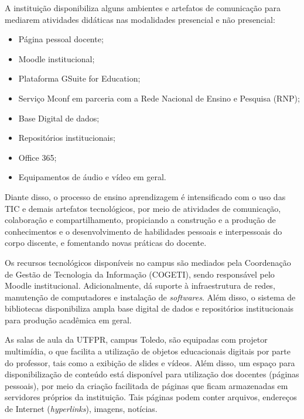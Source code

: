 

A instituição disponibiliza alguns ambientes e artefatos de comunicação para mediarem atividades didáticas nas modalidades presencial e não presencial:

\begin{itemize}
    \item Página pessoal docente;
    \item Moodle institucional;
    \item Plataforma GSuite for Education;
    \item Serviço Mconf em parceria com a Rede Nacional de Ensino e Pesquisa (RNP);
    \item Base Digital de dados;
    \item Repositórios institucionais;
    \item Office 365;
    \item Equipamentos de áudio e vídeo em geral.
\end{itemize}
    
Diante disso, o processo de ensino aprendizagem é intensificado com o uso das TIC e demais artefatos tecnológicos, por meio de atividades de comunicação, colaboração e compartilhamento, propiciando a construção e a produção de conhecimentos e o desenvolvimento de habilidades pessoais e interpessoais do corpo discente, e fomentando novas práticas do docente.

Os recursos tecnológicos disponíveis no campus são mediados pela Coordenação de Gestão de Tecnologia da Informação (COGETI), sendo responsável pelo Moodle institucional. Adicionalmente, dá suporte à infraestrutura de redes, manutenção de computadores e instalação de \textit{softwares}. Além disso, o sistema de bibliotecas disponibiliza ampla base digital de dados e repositórios institucionais para produção acadêmica em geral.

As salas de aula da UTFPR, campus Toledo, são equipadas com projetor multimídia, o que facilita a utilização de objetos educacionais digitais por parte do professor, tais como a exibição de slides e vídeos. Além disso, um espaço para disponibilização de conteúdo está disponível para utilização dos docentes (páginas pessoais), por meio da criação facilitada de páginas que ficam armazenadas em servidores próprios da instituição. Tais páginas podem conter arquivos, endereços de Internet (\textit{hyperlinks}), imagens, notícias.

